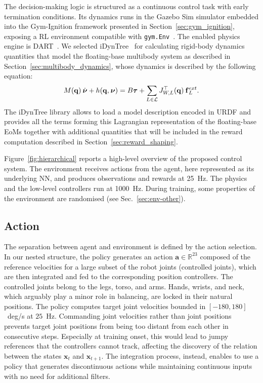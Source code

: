 The decision-making logic is structured as a continuous control task with early termination conditions.
Its dynamics runs in the Gazebo Sim simulator embedded into the Gym-Ignition framework presented in Section~\ref{sec:gym_ignition}, exposing a \ac{RL} environment compatible with \verb|gym.Env|~\parencite{brockman_openai_2016}.
The enabled physics engine is DART~\parencite{lee_dart_2018}.
We selected iDynTree~\parencite{nori_icub_2015} for calculating rigid-body dynamics quantities that model the floating-base multibody system as described in Section~\ref{sec:multibody_dynamics}, whose dynamics is described by the following equation:
%
\begin{equation}
    M(\mathbf{q}) \prescript{}{}{\dot{\boldsymbol{\nu}}} + h(\mathbf{q}, \prescript{}{}{\boldsymbol{\nu}}) = B \boldsymbol{\tau} + \sum_{L \in \mathcal{L}} J_{W,L}^\top(\mathbf{q}) \prescript{}{}{\mathbf{f}}_L^{ext}
    .
\end{equation}
%
The iDynTree library allows to load a model description encoded in \ac{URDF} and provides all the terms forming this Lagrangian representation of the floating-base \acp{EoM} together with additional quantities that will be included in the reward computation described in Section~\ref{sec:reward_shaping}.

Figure~\ref{fig:hierarchical} reports a high-level overview of the proposed control system.
The environment receives actions from the agent, here represented as its underlying \ac{NN}, and produces observations and rewards at 25~Hz.
The physics and the low-level \pid controllers run at 1000~Hz.
During training, some properties of the environment are randomised (see Sec.~\ref{sec:env-other}).

\pagebreak
\subsection{Action}

The separation between agent and environment is defined by the  action selection.
In our nested structure, the policy generates an action $\mathbf{a} \in \mathbb{R}^{23}$ composed of the reference velocities for a large subset of the robot joints (controlled joints), which are then integrated and fed to the corresponding \pid position controllers.
The controlled joints belong to the legs, torso, and arms.
Hands, wrists, and neck, which arguably play a minor role in balancing, are locked in their natural positions.
The policy computes target joint velocities bounded in $[-180,180]$~deg/s at $25$~Hz.
Commanding joint velocities rather than joint positions prevents target joint positions from being too distant from each other in consecutive steps.
Especially at training onset, this would lead to jumpy references that the \pid controllers cannot track, affecting the discovery of the relation between the states $\mathbf{x}_t$ and $\mathbf{x}_{t+1}$.
The integration process, instead, enables to use a policy that generates discontinuous actions while maintaining continuous \pid inputs with no need for additional filters.

